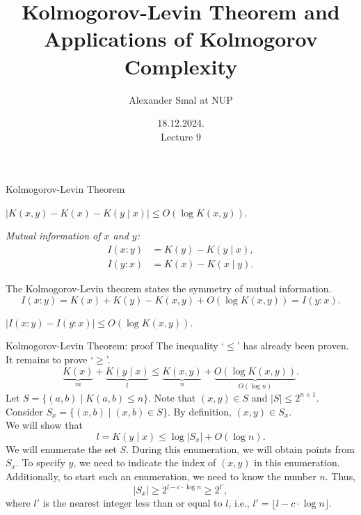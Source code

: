 \documentclass[aspectratio=169]{beamer}
\title{Kolmogorov-Levin Theorem and\\ Applications of Kolmogorov Complexity}
\author{Alexander Smal at NUP}
\date{18.12.2024.\\ Lecture 9}
\begin{document}
\begin{frame}[plain]
    \maketitle
\end{frame}

\begin{frame}{Kolmogorov-Levin Theorem}
\begin{theorem}\label{thm:kolmogorov-levin}
    $|K(x,y) - K(x) - K(y \mid x)| \le O(\log K(x,y))$.
\end{theorem}

\begin{definition}
    \emph{Mutual information of $x$ and $y$:}
    \[
    \begin{aligned}
        I(x:y) &= K(y) - K(y \mid x),\\
        I(y:x) &= K(x) - K(x \mid y).
    \end{aligned}
    \]
\end{definition}

The Kolmogorov-Levin theorem states the symmetry of mutual information.
\[
I(x:y) = K(x) + K(y) - K(x,y) + O(\log K(x,y)) = I(y:x).
\]
\vspace{-5mm}
\begin{corollary}
    $|I(x:y) - I(y:x)| \le O(\log K(x,y))$.
\end{corollary}
\end{frame}


\begin{frame}{Kolmogorov-Levin Theorem: proof}
    The inequality `$\le$' has already been proven. It remains to prove `$\ge$'.
    \[
    \underbrace{K(x)}_{m} + \underbrace{K(y \mid x)}_l \le \underbrace{K(x,y)}_n + \underbrace{O(\log K(x,y))}_{O(\log n)}.
    \]
    Let $S = \{(a,b) \mid K(a,b) \le n\}$. Note that $(x,y) \in S$ and $|S| \le 2^{n+1}$.\\
    Consider $S_x = \{(x,b) \mid (x,b) \in S\}$.
    By definition, $(x,y) \in S_x$.
    \\We will show that
    \[
    l = K(y \mid x) \le \log |S_x| + O(\log n).
    \]
    We will enumerate the set $S$. During this enumeration, we will obtain points from $S_x$. To specify $y$, we need to indicate the index of $(x,y)$ in this enumeration. Additionally, to start such an enumeration, we need to know the number $n$. Thus,
    \[|S_x| \ge 2^{l - c \cdot \log n} \ge 2^{l'},\]
    where $l'$ is the nearest integer less than or equal to $l$, i.e., $l' = \lfloor l - c \cdot \log n \rfloor$.

\end{frame}
\end{document}

